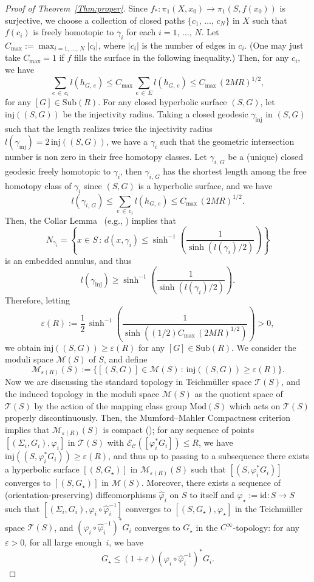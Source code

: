 \documentclass[11pt]{article}
\theoremstyle{definition}
\newcommand{\Mc}{\mathcal{M}}
\numberwithin{equation}{section}
\newcommand{\g}{\gamma}
\renewcommand{\SS}{\Sigma}
\newcommand{\e}{\varepsilon}
\newcommand{\f}{\varphi}
\newcommand{\Cc}{\mathcal{C}}
\renewcommand{\Mc}{\mathcal{M}}
\newcommand{\Ec}{\mathcal{E}}
\newcommand{\Tc}{\mathcal{T}}
\newcommand*\id{\mathrm{id}}
\newcommand*\inj{\mathrm{inj}}
\newcommand*\Mod{\mathrm{Mod}}
\newcommand*\Sub{\mathrm{Sub}}
\newcommand*\wh{\widehat}
\begin{document}
\begin{proof}[{Proof of Theorem~\ref{Thm:proper}}]
Since $f_\ast: \pi_1(X, x_0) \to \pi_1(S, f(x_0))$ is surjective, we choose a collection of closed paths $\{c_1,\,\dots,\, c_N\}$ in $X$ such that $f(c_i)$ is freely homotopic to $\g_i$ for each $i=1,\,\dots,\,N$. Let $C_{\max}:=\max_{i=1,\,\dots,\,N} |c_i|$, where $|c_i|$ is the number of edges in $c_i$. (One may just take $C_{\max}=1$ if $f$ fills the surface in the following inequality.) Then, for any $c_i$, we have
\[
\sum_{e\,\in\,c_i}l\left(h_{G,\,e}\right) \le C_{\max}\, \sum_{e\,\in\,E}l\left(h_{G,\,e}\right) \le C_{\max}\,(2 MR)^{1/2},
\]
for any $[G] \in \Sub(R)$. For any closed hyperbolic surface $(S, G)$, let $\inj((S, G))$ be the injectivity radius. Taking a closed geodesic $\g_{\inj}$ in $(S, G)$ such that the length realizes twice the injectivity radius $l(\g_{\inj})=2\, \inj ((S, G))$, we have a $\g_i$ such that the geometric intersection number is non zero in their free homotopy classes. Let $\g_{i,\,G}$ be a (unique) closed geodesic freely homotopic to $\g_i$, then $\g_{i,\,G}$ has the shortest length among the free homotopy class of $\g_i$ since $(S, G)$ is a hyperbolic surface, and we have
\[
l(\g_{i,\,G}) \le \sum_{e\,\in\,c_i}l(h_{G, \,e}) \le C_{\max}\,(2 MR)^{1/2}.
\]
Then, the Collar Lemma~\cite{Keen} (e.g., \cite[Lemma~13.6]{FarbMargalit}) implies that
\[
N_{\g_i}=\left\{x \in S \, : \, d(x, \g_i) \le \sinh^{-1}\left(\frac{1}{\sinh (l(\g_i)/2)}\right)\right\}
\]
is an embedded annulus, and thus
\[
l(\g_{\inj}) \ge \sinh^{-1}\left(\frac{1}{\sinh (l(\g_i)/2)}\right).
\]
Therefore, letting
\[
\e(R):=\frac{1}{2}\,\sinh^{-1}\left(\frac{1}{\sinh ((1/2)C_{\max}\,(2 MR)^{1/2})}\right)>0,
\]
we obtain $\inj ((S, G)) \ge \e(R)$ for any $[G] \in \Sub(R)$. We consider the moduli space $\Mc(S)$ of $S$, and define
\[
\Mc_{\e(R)}(S):=\big\{[(S, G)] \in \Mc(S) \, : \, \inj((S, G))\ge \e(R) \big\}.
\]
Now we are discussing the standard topology in Teichm\"uller space $\Tc(S)$, and the induced topology in the moduli space $\Mc(S)$ as the quotient space of $\Tc(S)$ by the action of the mapping class group $\Mod(S)$ which acts on $\Tc(S)$ properly discontinuously. Then, the Mumford--Mahler Compactness criterion implies that $\Mc_{\e(R)}(S)$ is compact (\cite[Theorem~C.1]{TrombaBook}); for any sequence of points $[(\SS_i, G_i), \f_i]$ in $\Tc(S)$ with $\Ec_\Cc([\f_i^\ast G_i]) \le R$, we have $\inj((S, \f_i^\ast G_i)) \ge \e(R)$, and thus up to passing to a subsequence there exists a hyperbolic surface $[(S, G_\star)]$ in $\Mc_{\e(R)}(S)$ such that $[(S, \f_i^\ast G_i)]$ converges to $[(S, G_\star)]$ in $\Mc(S)$. Moreover, there exists a sequence of (orientation-preserving) diffeomorphisms $\wh \f_i$ on $S$ to itself and $\f_\star:=\id:S \to S$ such that $[(\SS_i, G_i), \f_i \circ \wh \f_i^{-1}]$ converges to $[(S, G_\star), \f_\star]$ in the Teichm\"uller space $\Tc(S)$, and $(\f_i \circ \wh \f_i^{-1})^\ast G_i$ converges to $G_\star$ in the $C^\infty$-topology: for any $\e>0$, for all large enough~$i$, we have
\begin{equation}\label{Eq:dilatation}
G_\star \le (1+\e)\left(\f_i \circ \wh \f_i^{-1}\right)^\ast G_i.
\end{equation}


\end{proof}
\end{document}
